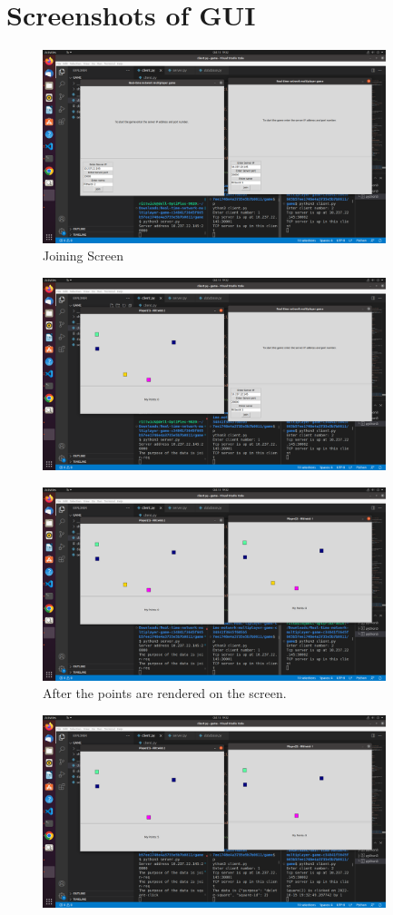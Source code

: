 \documentclass[manuscript,screen,review,nonacm]{acmart}
\begin{document}
\section{Screenshots of GUI}
\begin{figure}[htp]
    \centering
    \includegraphics[width=10cm]{1.png}
    \caption{Joining Screen}
    \label{fig:galaxy}
\end{figure}
\begin{figure}[htp]
    \centering
    \includegraphics[width=10cm]{2.png}
    \caption{}
    \label{fig:galaxy}
\end{figure}
\begin{figure}[htp]
    \centering
    \includegraphics[width=10cm]{3.png}
    \caption{After the points are rendered on the screen.}
    \label{fig:galaxy}
\end{figure}
\begin{figure}[htp]
    \centering
    \includegraphics[width=10cm]{4.png}
    \caption{}
    \label{fig:galaxy}
\end{figure}
\end{document}

